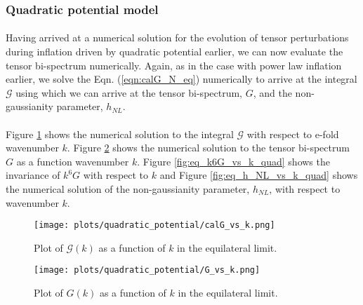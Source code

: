 \documentclass[12pt,a4paper,oneside]{book}
\begin{document}
\subsubsection{Quadratic potential model}

\paragraph*{} Having arrived at a numerical solution for the evolution of tensor 
perturbations during inflation driven by quadratic potential earlier, we can now evaluate 
the tensor bi-spectrum numerically. Again, as in the case with power law inflation earlier, 
we solve the Eqn. (\ref{eqn:calG_N_eq}) numerically to arrive at the integral $\mathcal{G}$ 
using which we can arrive at the tensor bi-spectrum, $G$, and the non-gaussianity parameter, 
$h_{NL}$.

\paragraph*{} Figure \ref{fig:eq_calG_vs_k_quad} shows the numerical solution to the integral $\mathcal{G}$ 
with respect to e-fold wavenumber $k$. Figure \ref{fig:eq_G_vs_k_quad} shows the numerical solution to the 
tensor bi-spectrum $G$ as a function wavenumber $k$. Figure \ref{fig:eq_k6G_vs_k_quad} shows the 
invariance of $k^6G$ with respect to $k$ and Figure \ref{fig:eq_h_NL_vs_k_quad} shows the numerical 
solution of the non-gaussianity parameter, $h_{NL}$, with respect to wavenumber $k$.

\begin{figure}
\begin{center}
\texttt{[image: plots/quadratic\_potential/calG\_vs\_k.png]}
\caption[Plot of $\mathcal{G}(k)$ as a function of $k$ in the equilateral limit in quadratic potential model.]
{Plot of $\mathcal{G}(k)$ as a function of $k$ in the equilateral limit.}
\label{fig:eq_calG_vs_k_quad}
\end{center}
\end{figure}

\begin{figure}
\begin{center}
\texttt{[image: plots/quadratic\_potential/G\_vs\_k.png]}
\caption[Plot of $G(k)$ as a function of $k$ in the equilateral limit in quadratic potential model.]
{Plot of $G(k)$ as a function of $k$ in the equilateral limit.}
\label{fig:eq_G_vs_k_quad}
\end{center}
\end{figure}
\end{document}
